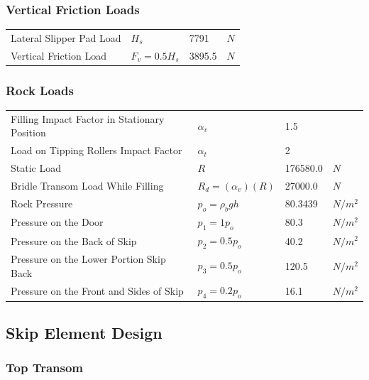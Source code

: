 \documentclass{article}%
\begin{document}
%
\subsubsection{Vertical Friction Loads}%
\label{ssubsec:VerticalFrictionLoads}%
\begin{flushleft}%
\begin{minipage}{\textwidth}%
\flushleft%
\begin{tabular}{l l l l}%
Lateral Slipper Pad Load&$H_s$&7791&$N$\\%
Vertical Friction Load&$F_v = 0.5 H_s$&3895.5&$N$\\%
\end{tabular}%
\end{minipage}%
\end{flushleft}

%
\subsubsection{Rock Loads}%
\label{ssubsec:RockLoads}%
\begin{flushleft}%
\begin{minipage}{\textwidth}%
\flushleft%
\begin{tabular}{l l l l}%
Filling Impact Factor in Stationary Position&$\alpha_v$&1.5&\\%
Load on Tipping Rollers Impact Factor&$\alpha_t$&2&\\%
Static Load&$R$&176580.0&$N$\\%
Bridle Transom Load While Filling&$R_d = (\alpha_v)(R) $&27000.0&$N$\\%
Rock Pressure&$p_o = \rho_b g h$&80.3439&$N/m^2$\\%
Pressure on the Door&$p_1 = 1 p_o$&80.3&$N/m^2$\\%
Pressure on the Back of Skip&$p_2 = 0.5 p_o$&40.2&$N/m^2$\\%
Pressure on the Lower Portion Skip Back&$p_3 = 0.5 p_o$&120.5&$N/m^2$\\%
Pressure on the Front and Sides of Skip&$p_4 = 0.2 p_o$&16.1&$N/m^2$\\%
\end{tabular}%
\end{minipage}%
\end{flushleft}

%
\subsection{Skip Element Design}%
\label{subsec:SkipElementDesign}%
\subsubsection{Top Transom}%
\label{ssubsec:TopTransom}%
\end{document}
